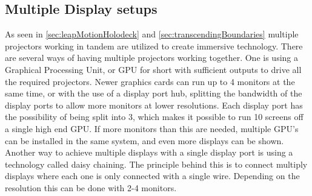 \subsection{Multiple Display setups}
As seen in \autoref{sec:leapMotionHolodeck} and \autoref{sec:transcendingBoundaries} multiple projectors working in tandem are utilized to create immersive technology. There are several ways of having multiple projectors working together. One is using a Graphical Processing Unit, or GPU for short with sufficient outputs to drive all the required projectors. Newer graphics cards can run up to 4 monitors at the same time, or with the use of a display port hub, splitting the bandwidth of the display ports to allow more monitors at lower resolutions. Each display port has the possibility of being split into 3, which makes it possible to run 10 screens off a single high end GPU. If more monitors than this are needed, multiple GPU's can be installed in the same system, and even more displays can be shown. Another way to achieve multiple displays with a single display port is using a technology called daisy chaining. The principle behind this is to connect multiply displays where each one is only connected with a single wire. Depending on the resolution this can be done with 2-4 monitors.
